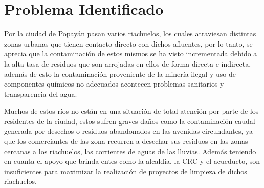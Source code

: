 \section{Problema Identificado}
  Por la ciudad de Popayán pasan varios riachuelos, los cuales atraviesan distintas zonas urbanas que tienen contacto directo con dichos afluentes, por lo tanto, se aprecia que la contaminación de estos mismos se ha visto incrementada debido a la alta tasa de residuos que son arrojadas en ellos de forma directa e indirecta, además de esto la contaminación proveniente de la minería ilegal y uso de componentes químicos no adecuados acontecen problemas sanitarios y transparencia del agua.

  Muchos de estos ríos no están en una situación de total atención por parte de los residentes de la ciudad, estos sufren graves daños como la contaminación caudal generada por desechos o residuos abandonados en las avenidas circundantes, ya que los comerciantes de las zona recurren a desechar sus residuos en las zonas cercanas a los riachuelos, las corrientes de aguas de las lluvias. Además teniendo en cuanta el apoyo que brinda entes como la alcaldía, la CRC y el acueducto, son insuficientes para maximizar la realización de proyectos de limpieza de dichos riachuelos.

